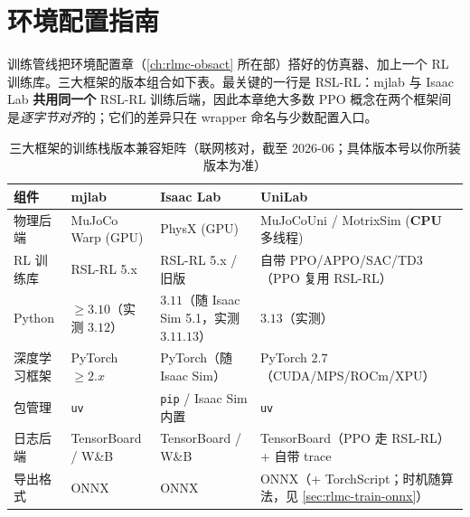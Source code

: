 \section*{环境配置指南}
\label{sec:rlmc-train-setup}

训练管线把环境配置章（\cref{ch:rlmc-obsact} 所在部）搭好的仿真器、加上一个 RL 训练库。三大框架的版本组合如下表。最关键的一行是 RSL-RL：mjlab 与 Isaac Lab \textbf{共用同一个} RSL-RL 训练后端，因此本章绝大多数 PPO 概念在两个框架间是\emph{逐字节对齐}的；它们的差异只在 wrapper 命名与少数配置入口。

\begin{table}[H]
\centering
\caption{三大框架的训练栈版本兼容矩阵（联网核对，截至 2026-06；具体版本号以你所装版本为准）}
\label{tab:rlmc-train-versions}
\begin{tabular}{llll}
\hline
组件 & mjlab & Isaac Lab & UniLab \\
\hline
物理后端 & MuJoCo Warp (GPU) & PhysX (GPU) & MuJoCoUni / MotrixSim (\textbf{CPU} 多线程) \\
RL 训练库 & RSL-RL 5.x & RSL-RL 5.x / 旧版 & 自带 PPO/APPO/SAC/TD3（PPO 复用 RSL-RL） \\
Python & $\ge 3.10$（实测 $3.12$） & $3.11$（随 Isaac Sim 5.1，实测 $3.11.13$） & $3.13$（实测） \\
深度学习框架 & PyTorch $\ge 2.x$ & PyTorch（随 Isaac Sim） & PyTorch $2.7$（CUDA/MPS/ROCm/XPU） \\
包管理 & \verb|uv| & \verb|pip| / Isaac Sim 内置 & \verb|uv| \\
日志后端 & TensorBoard / W\&B & TensorBoard / W\&B & TensorBoard（PPO 走 RSL-RL）+ 自带 trace \\
导出格式 & ONNX & ONNX & ONNX（+ TorchScript；时机随算法，见 \cref{sec:rlmc-train-onnx}） \\
\hline
\end{tabular}
\end{table}


